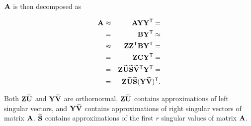 $\mathbf{A}$ is then decomposed as

\begin{eqnarray}
\mathbf{A} &\approx& \mathbf{A}\mathbf{Y}\mathbf{Y}^{\mathsf{T}} =
\\
&=& \mathbf{B}\mathbf{Y}^{\mathsf{T}} \approx \nonumber
\\
&\approx& \mathbf{Z}\mathbf{Z}^{\mathsf{T}}\mathbf{B}\mathbf{Y}^{\mathsf{T}} = \nonumber
\\
&=& \mathbf{Z}\mathbf{C}\mathbf{Y}^{\mathsf{T}} = \nonumber
\\
&=& \mathbf{Z}\mathbf{\widetilde{U}} \mathbf{\widetilde{S}} \mathbf{\widetilde{V}}^{\mathsf{T}}\mathbf{Y}^{\mathsf{T}} = \nonumber
\\
&=& \mathbf{Z}\mathbf{\widetilde{U}} \mathbf{\widetilde{S}} (\mathbf{Y}\mathbf{\widetilde{V}})^{\mathsf{T}}. \nonumber
\label{eq:redsvd}
\end{eqnarray}

\noindent
Both $\mathbf{Z}\mathbf{\widetilde{U}}$ and $\mathbf{Y}\mathbf{\widetilde{V}}$ are orthornormal, $\mathbf{Z}\mathbf{\widetilde{U}}$ contains approximations of left singular vectors, and $\mathbf{Y}\mathbf{\widetilde{V}}$ contains approximations of right singular vectors of matrix $\mathbf{A}$. $\mathbf{\widetilde{S}}$ contains approximations of the first $r$ singular values of matrix $\mathbf{A}$.


